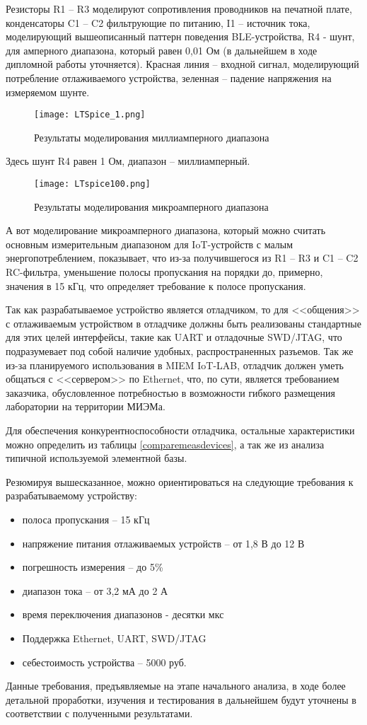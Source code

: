 Резисторы R1 -- R3 моделируют сопротивления проводников на печатной плате, конденсаторы C1 -- C2 фильтрующие 
по питанию, I1 -- источник тока, моделирующий вышеописанный паттерн поведения BLE-устройства,
R4 - шунт, для амперного диапазона, который равен 0,01 Ом (в дальнейшем в ходе дипломной работы уточняется). 
Красная линия -- входной сигнал, моделирующий потребление отлаживаемого устройства, 
зеленная -- падение напряжения на измеряемом шунте. 

\begin{figure}[H]
  \centering
  \texttt{[image: LTSpice\_1.png]}
  \caption{Результаты моделирования миллиамперного диапазона }
  \label{ris:LTSpice_1}
\end{figure}

Здесь шунт R4 равен 1 Ом, диапазон -- миллиамперный. 

\begin{figure}[H]
  \centering
  \texttt{[image: LTspice100.png]}
  \caption{Результаты моделирования микроамперного диапазона }
  \label{ris:LTSpice100}
\end{figure}

А вот моделирование микроамперного диапазона, который можно считать основным измерительным диапазоном для 
IoT-устройств с малым энергопотреблением, показывает, что из-за получившегося из R1 -- R3 и C1 -- C2 RC-фильтра,
уменьшение полосы пропускания на порядки до, примерно, значения в  15 кГц, что определяет требование 
к полосе пропускания.

Так как разрабатываемое устройство является отладчиком, то для <<общения>> с отлаживаемым устройством 
в отладчике должны быть реализованы стандартные для этих целей интерфейсы, такие как UART и отладочные 
SWD/JTAG, что подразумевает под собой наличие удобных, распространенных разъемов. Так же из-за планируемого 
использования в MIEM IoT-LAB, отладчик должен уметь общаться с <<сервером>> по Ethernet, что, по сути,
является требованием заказчика, обусловленное потребностью в возможности гибкого размещения лаборатории на 
территории МИЭМа.  

Для обеспечения конкурентноспособности отладчика, остальные характеристики можно определить 
из таблицы \ref{comparemeasdevices}, а так же из анализа типичной используемой элементной базы.

Резюмируя вышесказанное, можно ориентироваться на следующие требования к разрабатываемому 
устройству:
\begin{itemize}
    \item полоса пропускания -- 15 кГц
    \item напряжение питания отлаживаемых устройств -- от 1,8 В до 12 В
    \item погрешность измерения -- до 5\%
    \item диапазон тока -- от 3,2 мА до 2 А
    \item время переключения диапазонов - десятки мкс
    \item Поддержка Ethernet, UART, SWD/JTAG
    \item себестоимость устройства -- 5000 руб.
\end{itemize}

Данные требования, предъявляемые на этапе начального анализа, в ходе более детальной проработки,
изучения и тестирования в дальнейшем будут уточнены в соответствии с полученными результатами.
